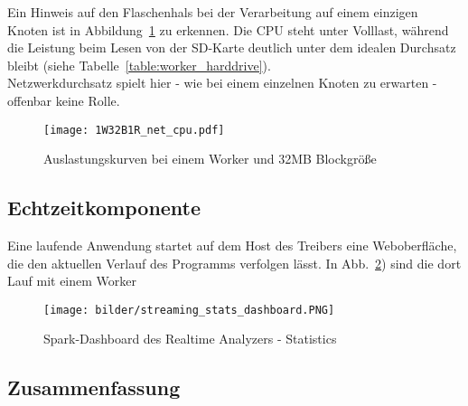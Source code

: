 Ein Hinweis auf den Flaschenhals bei der Verarbeitung auf einem einzigen Knoten ist in Abbildung~\ref{figure:1W32B1R_net_cpu} zu erkennen. Die CPU steht unter Volllast, während die Leistung beim Lesen von der SD-Karte deutlich unter dem idealen Durchsatz bleibt (siehe Tabelle~\ref{table:worker_harddrive}).\\
Netzwerkdurchsatz spielt hier - wie bei einem einzelnen Knoten zu erwarten - offenbar keine Rolle.

\begin{figure}[ht!]
	\centering
  \texttt{[image: 1W32B1R\_net\_cpu.pdf]}
	\caption{Auslastungskurven bei einem Worker und 32MB Blockgröße}
	\label{figure:1W32B1R_net_cpu}
\end{figure}



\subsection{Echtzeitkomponente}

Eine laufende Anwendung startet auf dem Host des Treibers eine Weboberfläche, die den aktuellen Verlauf des Programms verfolgen lässt. In Abb.~\ref{figure:realtime_dashboard_stats}) sind die dort Lauf mit einem Worker

\begin{figure}[ht!]
	\centering
	\texttt{[image: bilder/streaming\_stats\_dashboard.PNG]}
	\caption{Spark-Dashboard des Realtime Analyzers - Statistics}
	\label{figure:realtime_dashboard_stats}
\end{figure}


\subsection{Zusammenfassung}
